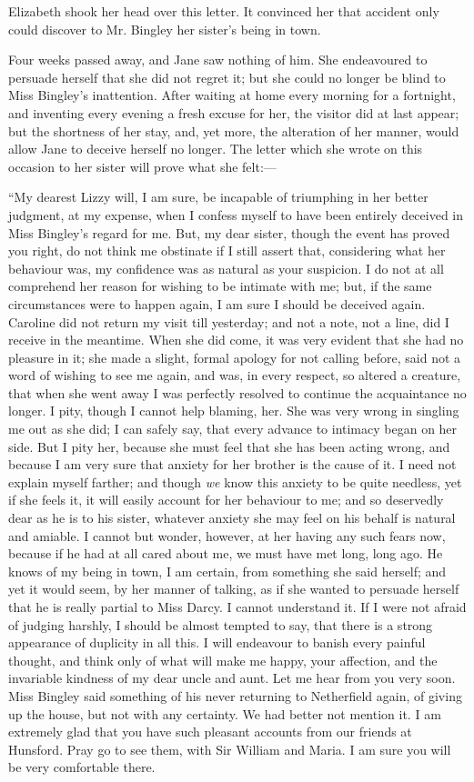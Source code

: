 \documentclass[12pt]{book}
\begin{document}
Elizabeth shook her head over this letter. It convinced her that accident only could discover to Mr. Bingley her sister's being in town.

Four weeks passed away, and Jane saw nothing of him. She endeavoured to persuade herself that she did not regret it; but she could no longer be blind to Miss Bingley's inattention. After waiting at home every morning for a fortnight, and inventing every evening a fresh excuse for her, the visitor did at last appear; but the shortness of her stay, and, yet more, the alteration of her manner, would allow Jane to deceive herself no longer. The letter which she wrote on this occasion to her sister will prove what she felt:---

``My dearest Lizzy will, I am sure, be incapable of triumphing in her better judgment, at my expense, when I confess myself to have been entirely deceived in Miss Bingley's regard for me. But, my dear sister, though the event has proved you right, do not think me obstinate if I still assert that, considering what her behaviour was, my confidence was as natural as your suspicion. I do not at all comprehend her reason for wishing to be intimate with me; but, if the same circumstances were to happen again, I am sure I should be deceived again. Caroline did not return my visit till yesterday; and not a note, not a line, did I receive in the meantime. When she did come, it was very evident that she had no pleasure in it; she made a slight, formal apology for not calling before, said not a word of wishing to see me again, and was, in every respect, so altered a creature, that when she went away I was perfectly resolved to continue the acquaintance no longer. I pity, though I cannot help blaming, her. She was very wrong in singling me out as she did; I can safely say, that every advance to intimacy began on her side. But I pity her, because she must feel that she has been acting wrong, and because I am very sure that anxiety for her brother is the cause of it. I need not explain myself farther; and though \textit{we} know this anxiety to be quite needless, yet if she feels it, it will easily account for her behaviour to me; and so deservedly dear as he is to his sister, whatever anxiety she may feel on his behalf is natural and amiable. I cannot but wonder, however, at her having any such fears now, because if he had at all cared about me, we must have met long, long ago. He knows of my being in town, I am certain, from something she said herself; and yet it would seem, by her manner of talking, as if she wanted to persuade herself that he is really partial to Miss Darcy. I cannot understand it. If I were not afraid of judging harshly, I should be almost tempted to say, that there is a strong appearance of duplicity in all this. I will endeavour to banish every painful thought, and think only of what will make me happy, your affection, and the invariable kindness of my dear uncle and aunt. Let me hear from you very soon. Miss Bingley said something of his never returning to Netherfield again, of giving up the house, but not with any certainty. We had better not mention it. I am extremely glad that you have such pleasant accounts from our friends at Hunsford. Pray go to see them, with Sir William and Maria. I am sure you will be very comfortable there.
\end{document}
